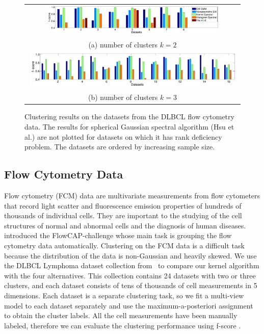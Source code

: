 \documentclass{article}
\begin{document}
\begin{figure}[t!]
  \centering
	\begin{tabular}{c}
		\includegraphics[width=0.82\textwidth]{../experiment/figure_new/paired_bar_chat_k_2} \\[-2mm]
		(a) number of clusters $k=2$ \\[-1mm]
		\includegraphics[width=0.98\textwidth]{../experiment/figure_new/paired_bar_chat_k_3}  \\[-2mm]
		(b) number of clusters $k=3$
	\end{tabular}
  \vspace{-4mm}
  \caption{Clustering results on the datasets from the DLBCL flow cytometry data. The results for spherical Gaussian spectral algorithm (Hsu et al.) are not plotted for datasets on which it has rank deficiency problem. The datasets are ordered by increasing sample size.}\label{fig:real_data}
  \vspace{-3mm}
\end{figure}

\vspace{-3mm}
\subsection{Flow Cytometry Data}
\vspace{-2mm}
% 
Flow cytometry (FCM) data are multivariate measurements from flow cytometers that record light scatter and fluorescence emission properties of hundreds of thousands of individual cells. They are important to the studying of the cell structures of normal and abnormal cells and the diagnosis of human diseases. \citet{AghFinEtal13} introduced the FlowCAP-challenge whose main task is grouping the flow cytometry data automatically. Clustering on the FCM data is a difficult task because the distribution of the data is non-Gaussian and heavily skewed. We use the DLBCL Lymphoma dataset collection from~\cite{AghFinEtal13} to compare our kernel algorithm with the four alternatives.
This collection contains 24 datasets with two or three clusters, and each dataset consists of tens of thousands of cell measurements in 5 dimensions. Each dataset is a separate clustering task, so we fit a multi-view model to each dataset separately and use the maximum-a-posteriori assignment to obtain the cluster labels.  All the cell measurements have been manually labeled, therefore we can evaluate the clustering performance using f-score \cite{AghFinEtal13}.
\end{document}
